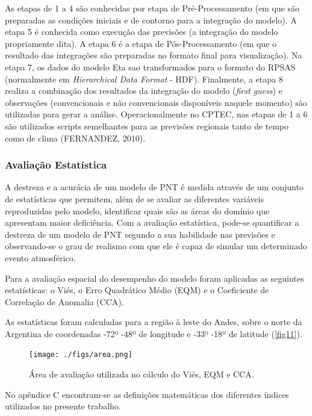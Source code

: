 As etapas de 1 a 4 são conhecidas por etapa de Pré-Processamento (em que são preparadas as condições iniciais e de contorno para a integração do modelo). A etapa 5 é conhecida como execução das previsões (a integração do modelo propriamente dita). A etapa 6 é a etapa de Pós-Processamento (em que o resultado das integrações são preparadas no formato final para visualização). Na etapa 7, os dados do modelo Eta sao transformados para o formato do RPSAS (normalmente em \textit{Hierarchical Data Format} - HDF). Finalmente, a etapa 8 realiza a combinação dos resultados da integração do modelo (\textit{first guess}) e observações (convencionais e não convencionais disponíveis naquele momento) são utilizadas para gerar a análise. Operacionalmente no CPTEC, nas etapas de 1 a 6 são utilizados scripts semelhantes para as previsões regionais tanto de tempo como de clima (FERNANDEZ, 2010).

\subsubsection{Avaliação Estatística}

A destreza e a acurácia de um modelo de PNT é medida através de um conjunto de estatísticas que permitem, além de se avaliar as diferentes variáveis reproduzidas pelo modelo, identificar quais são as áreas do domínio que apresentam maior deficiência. Com a avaliação estatística, pode-se quantificar a destreza de um modelo de PNT segundo a sua habilidade nas previsões e observando-se o grau de realismo com que ele é capaz de simular um determinado evento atmosférico.
    
Para a avaliação espacial do desempenho do modelo foram aplicadas as seguintes estatísticas: o Viés, o Erro Quadrático Médio (EQM) e o Coeficiente de Correlação de Anomalia (CCA). 

As estatísticas foram calculadas para a região à leste do Andes, sobre o norte da Argentina de coordenadas -72º -48º de longitude e -33º -18º de latitude (\autoref{fig11}).

\begin{figure}[!hbp]
\centering
\texttt{[image: ./figs/area.png]}
\caption{Área de avaliação utilizada no cálculo do Viés, EQM e CCA.}
\label{fig11}
\end{figure}

No apêndice C encontram-se as definições matemáticas dos diferentes índices utilizados no presente trabalho.